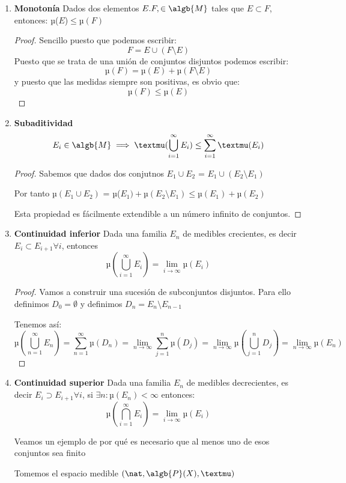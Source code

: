 \documentclass{apuntes}
\begin{document}
\begin{enumerate}
\item \textbf{Monotonía} Dados dos elementos $E. F, \in \algb{M}$ tales que $E\subset F$, entonces: µ($E$)$\leq µ(F)$
\begin{proof}
Sencillo puesto que podemos escribir:
\[F=E\cup(F \setminus E)\]
Puesto que se trata de una unión de conjuntos disjuntos podemos escribir:
\[µ(F)=µ(E)+µ(F\setminus E)\]
y puesto que las medidas siempre son positivas, es obvio que:
\[µ(F) \leq µ(E)\]
\end{proof}

\item \textbf{Subaditividad}
\[E_i \in \algb{M} \implies µ(\bigcup_{i=1}^{\infty}E_i)\leq \sum_{i=1}^{\infty}µ(E_i)\]

\begin{proof}
Sabemos que dados dos conjutnos $E_1 \cup E_2 $ = $E_1 \cup (E_2 \setminus E_1)$

Por tanto  $µ(E_1 \cup E_2) $ = µ($E_1) + µ(E_2 \setminus E_1) \leq µ(E_1)+µ(E_2)$

Esta propiedad es fácilmente extendible a un número infinito de conjuntos.
\end{proof}

\item \textbf{Continuidad inferior} Dada una familia $E_n$ de medibles crecientes, es decir $E_{i}\subset E_{i+1} \forall i$, entonces
\[µ(\bigcup_{i=1}^{\infty}E_i)=\lim_{i \to \infty} µ(E_i)\]

\begin{proof}
Vamos a construir una sucesión de subconjuntos disjuntos. Para ello definimos $D_0=\emptyset$ y definimos $D_n=E_n \setminus E_{n-1}$

Tenemos así:
\[µ(\bigcup_{n=1}^{\infty}E_n)=\sum_{n=1}^{\infty}µ(D_n)=\lim_{n \to \infty}
\sum_{j=1}^{n}µ(D_j)=\lim_{n \to \infty}µ(\bigcup_{j=1}^{n}D_j) = \lim_{n \to \infty}µ(E_n)\]
\end{proof}

\item \textbf{Continuidad superior} Dada una familia $E_n$ de medibles decrecientes, es decir $E_{i}\supset E_{i+1} \forall i$, si $\exists n: µ(E_n)< \infty$ entonces:
\[µ(\bigcap_{i=1}^{\infty}E_i)=\lim_{i \to \infty} µ(E_i)\]

Veamos un ejemplo de por qué es necesario que al menos uno de esos conjuntos sea finito
\begin{example}
Tomemos el espacio medible $(\nat, \algb{P}(X), µ)$


\end{example}
\end{enumerate}
\end{document}

